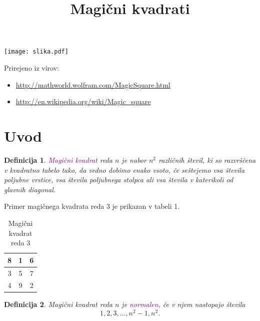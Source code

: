 \documentclass[a4paper,12pt]{article}
\title{Magični kvadrati}
\date{}
\newtheorem{definition}{Definicija}
\begin{document}
\maketitle
\begin{center}
   \texttt{[image: slika.pdf]}
\end{center}

Prirejeno iz virov:

\begin{itemize}
   \item \url{http://mathworld.wolfram.com/MagicSquare.html}
   \item \url{http://en.wikipedia.org/wiki/Magic_square}
\end{itemize}
\tableofcontents




\newpage
\section{Uvod}

\begin{definition}
   \textcolor{purple}{Magični kvadrat} reda $n$ je nabor $n^2$ različnih števil,
   ki so razvrščena v kvadratno tabelo tako, da vedno dobimo enako vsoto,
   če seštejemo vsa števila poljubne vrstice, vsa števila poljubnega
   stolpca ali vsa števila v katerikoli od glavnih diagonal.
\end{definition}

Primer magičnega kvadrata reda 3 je prikazan v tabeli 1.

\begin{table}[h!]
   \centering
   \caption{Magični kvadrat reda 3} 
   \label{tabel:magicni}
   \begin{tabular}{|c|c|c|}
       \hline
       8 & 1 & 6 \\ \hline
       3 & 5 & 7 \\ \hline
       4 & 9 & 2 \\ \hline
   \end{tabular}
\end{table}

\begin{definition}
   Magični kvadrat reda $n$ je \textcolor{purple}{normalen}, če v njem nastopajo števila
   \begin{equation}
      \label{eq:numbers}
      1, 2, 3, \ldots, n^2-1, n^2.
   \end{equation}
\end{definition}
\end{document}
